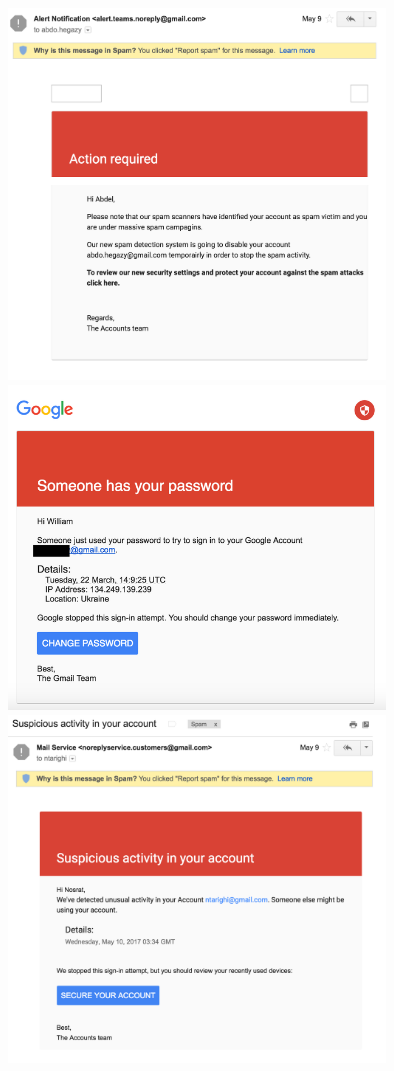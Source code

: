 \documentclass[nobackground,dvipsnames,table,aspectratio=169]{beamer}
\begin{document}
\begin{frame}{}
    \begin{columns}
            \centering
            \includegraphics[width=0.75\textwidth]{susmail1}
            \includegraphics[width=0.75\textwidth]{susmail3}
            \centering
            \includegraphics[width=0.75\textwidth]{susmail2}

\end{columns}
\end{frame}
\end{document}
